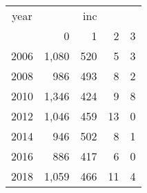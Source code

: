 \footnotesize\begin{tabular}[t]{lrrrr}
\toprule
\multicolumn{1}{c}{year} & \multicolumn{4}{c}{inc} \\
\cmidrule(l{3pt}r{3pt}){1-1} \cmidrule(l{3pt}r{3pt}){2-5}
  & 0 & 1 & 2 & 3\\
\midrule
2006 & 1,080 & 520 & 5 & 3\\
2008 & 986 & 493 & 8 & 2\\
2010 & 1,346 & 424 & 9 & 8\\
2012 & 1,046 & 459 & 13 & 0\\
2014 & 946 & 502 & 8 & 1\\
2016 & 886 & 417 & 6 & 0\\
2018 & 1,059 & 466 & 11 & 4\\
\bottomrule
\end{tabular}
